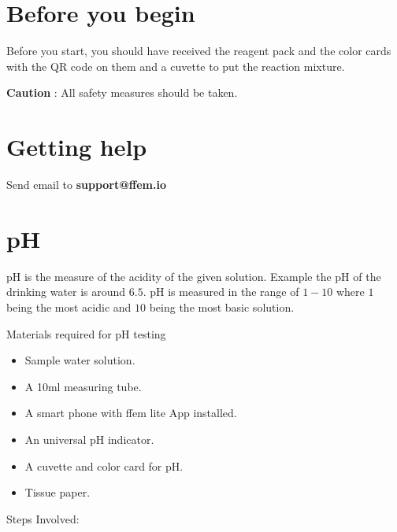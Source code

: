 \documentclass{article}
\begin{document}
    
\section{Before you begin}
    
 Before you start, you should have received the reagent pack and the color cards with the QR code on them and a cuvette to put the reaction mixture.
   
    \textbf{Caution} :  All safety measures should be taken. 


\section{Getting help}
Send email to \textbf{support@ffem.io} 

\section{pH}
  
pH is the measure of the acidity of the given solution. Example the pH of the drinking water is around  $6.5$.  pH  is measured in the range of $1-10$ where $1$ being the most acidic and $10$ being the most basic solution.
    
    Materials required for pH testing
    \begin{itemize}
    \item Sample water solution.  
    \item A 10ml measuring tube. 
    \item A smart phone with ffem lite App installed.
    \item An universal pH indicator.
    \item A cuvette and color card for pH.
    \item Tissue paper.
\end{itemize}   

Steps Involved:
  
\end{document}
